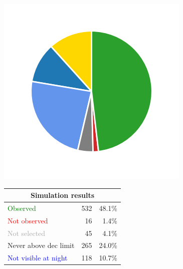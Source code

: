 \begin{colsection}
\newpage

\begin{figure}[p]
    \begin{center}
        \begin{minipage}[t]{0.15\linewidth}\vspace{0.6cm}
            \includegraphics[trim={.5cm 0 .5cm 0},clip,width=\linewidth]{images/gw_sims/1n4_pie.png}
        \end{minipage}
        \begin{minipage}[t]{0.45\linewidth}\vspace{0pt}
            \begin{tabular}{lrr}
                \multicolumn{3}{c}{\textbf{Simulation results}} \\
                \midrule
                \textcolor{Green}{Observed} & 532 & 48.1\% \\
                \textcolor{Red}{Not observed} & 16 & 1.4\% \\
                \textcolor{darkgray}{Not selected} & 45 & 4.1\% \\
                \textcolor{NavyBlue}{Never above dec limit} & 265 & 24.0\% \\
                \textcolor{Blue}{Not visible at night} & 118 & 10.7\% \\

\end{tabular}
\end{minipage}
\end{center}
\end{figure}
\end{colsection}

